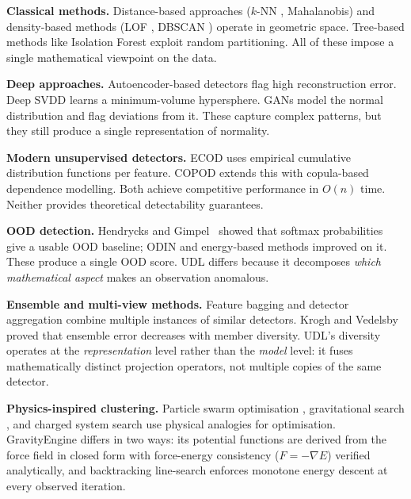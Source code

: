 \documentclass{article}
\begin{document}
\textbf{Classical methods.} Distance-based approaches ($k$-NN \citep{ramaswamy2000efficient}, Mahalanobis) and density-based methods (LOF \citep{breunig2000lof}, DBSCAN \citep{ester1996density}) operate in geometric space. Tree-based methods like Isolation Forest \citep{liu2008isolation} exploit random partitioning. All of these impose a single mathematical viewpoint on the data.

\textbf{Deep approaches.} Autoencoder-based detectors \citep{an2015variational,zhou2017anomaly} flag high reconstruction error. Deep SVDD \citep{ruff2018deep} learns a minimum-volume hypersphere. GANs \citep{schlegl2017unsupervised} model the normal distribution and flag deviations from it. These capture complex patterns, but they still produce a single representation of normality.

\textbf{Modern unsupervised detectors.} ECOD \citep{li2022ecod} uses empirical cumulative distribution functions per feature. COPOD \citep{li2020copod} extends this with copula-based dependence modelling. Both achieve competitive performance in $O(n)$ time. Neither provides theoretical detectability guarantees.

\textbf{OOD detection.} Hendrycks and Gimpel~\citep{hendrycks2017baseline} showed that softmax probabilities give a usable OOD baseline; ODIN \citep{liang2018odin} and energy-based methods \citep{liu2020energy} improved on it. These produce a single OOD score. UDL differs because it decomposes \emph{which mathematical aspect} makes an observation anomalous.

\textbf{Ensemble and multi-view methods.} Feature bagging \citep{lazarevic2005feature} and detector aggregation \citep{aggarwal2015theoretical} combine multiple instances of similar detectors. Krogh and Vedelsby~\citep{krogh1995neural} proved that ensemble error decreases with member diversity. UDL's diversity operates at the \emph{representation} level rather than the \emph{model} level: it fuses mathematically distinct projection operators, not multiple copies of the same detector.

\textbf{Physics-inspired clustering.} Particle swarm optimisation \citep{kennedy1995particle}, gravitational search \citep{rashedi2009gsa}, and charged system search \citep{kaveh2010css} use physical analogies for optimisation. GravityEngine differs in two ways: its potential functions are derived from the force field in closed form with force-energy consistency ($F = -\nabla E$) verified analytically, and backtracking line-search enforces monotone energy descent at every observed iteration.
\end{document}
